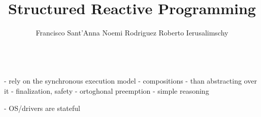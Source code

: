 \documentclass{acm_proc_article-sp}
\newcommand{\1}{\;}
\newcommand{\2}{\;\;}
\newcommand{\3}{\;\;\;}
\newcommand{\5}{\;\;\;\;\;}
\begin{document}
\title {
    Structured Reactive Programming
}

- rely on the synchronous execution model
- compositions
- than abstracting over it
- finalization, safety
- ortoghonal preemption
- simple reasoning

- OS/drivers are stateful

\author{
    \alignauthor
    Francisco Sant'Anna \hspace{1cm} Noemi Rodriguez \hspace{1cm} Roberto Ierusalimschy   \\
     \\
}

\maketitle
\end{document}
